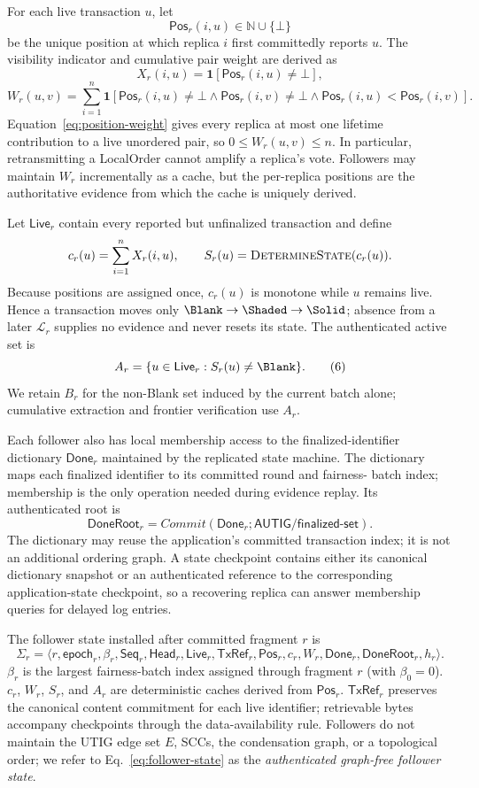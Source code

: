 For each live transaction $u$, let
\[
 \mathsf{Pos}_r(i,u)\in\mathbb N\cup\{\bot\}
\]
be the unique position at which replica $i$ first committedly reports $u$.
The visibility indicator and cumulative pair weight are derived as
\[
 X_r(i,u)=\mathbf 1[\mathsf{Pos}_r(i,u)\ne\bot],
\]
\[
 W_r(u,v)=\sum_{i=1}^{n}
 \mathbf 1[\mathsf{Pos}_r(i,u)\ne\bot\land
            \mathsf{Pos}_r(i,v)\ne\bot\land
            \mathsf{Pos}_r(i,u)<\mathsf{Pos}_r(i,v)].
 \tag{5}\label{eq:position-weight}
\]
Equation~\eqref{eq:position-weight} gives every replica at most one lifetime
contribution to a live unordered pair, so $0\le W_r(u,v)\le n$.  In
particular, retransmitting a LocalOrder cannot amplify a replica's vote.
Followers may maintain $W_r$ incrementally as a cache, but the per-replica
positions are the authoritative evidence from which the cache is uniquely
derived.

Let $\mathsf{Live}_r$ contain every reported but unfinalized transaction and
define
\[
 c_r(u)=\sum_{i=1}^{n}X_r(i,u),\qquad
 S_r(u)=\textsc{DetermineState}(c_r(u)).
\]
Because positions are assigned once, $c_r(u)$ is monotone while $u$ remains
live.  Hence a transaction moves only
$\Blank\rightarrow\Shaded\rightarrow\Solid$; absence from a later
$\mathcal L_r$ supplies no evidence and never resets its state.  The
authenticated active set is
\[
 A_r=\{u\in\mathsf{Live}_r:S_r(u)\ne\Blank\}.
 \tag{6}\label{eq:active-set}
\]
We retain $B_r$ for the non-Blank set induced by the current batch alone;
cumulative extraction and frontier verification use $A_r$.

Each follower also has local membership access to the finalized-identifier
dictionary $\mathsf{Done}_r$ maintained by the replicated state machine.  The
dictionary maps each finalized identifier to its committed round and fairness-
batch index; membership is the only operation needed during evidence replay.
Its authenticated root is
\[
 \mathsf{DoneRoot}_r=Commit(\mathsf{Done}_r;
                       \mathsf{AUTIG/finalized\mbox{-}set}).
\]
The dictionary may reuse the application's committed transaction index; it is
not an additional ordering graph.  A state checkpoint contains either its
canonical dictionary snapshot or an authenticated reference to the
corresponding application-state checkpoint, so a recovering replica can
answer membership queries for delayed log entries.

The follower state installed after committed fragment $r$ is
\[
 \Sigma_r=\langle r,\mathsf{epoch}_r,\beta_r,\mathsf{Seq}_r,
 \mathsf{Head}_r,\mathsf{Live}_r,\mathsf{TxRef}_r,\mathsf{Pos}_r,c_r,W_r,
 \mathsf{Done}_r,\mathsf{DoneRoot}_r,h_r\rangle.
 \tag{7}\label{eq:follower-state}
\]
$\beta_r$ is the largest fairness-batch index assigned through fragment $r$
(with $\beta_0=0$).  $c_r$, $W_r$, $S_r$, and $A_r$ are deterministic caches derived from
$\mathsf{Pos}_r$.  $\mathsf{TxRef}_r$ preserves the canonical content
commitment for each live identifier; retrievable bytes accompany checkpoints
through the data-availability rule.  Followers do not maintain the UTIG edge set $E$, SCCs, the
condensation graph, or a topological order; we refer to
Eq.~\eqref{eq:follower-state} as the \emph{authenticated graph-free follower
state}.

